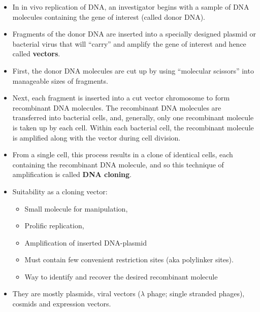 \documentclass[11pt,dvipsnames,ignorenonframetext,aspectratio=169]{beamer}
\providecommand{\tightlist}{%
  \setlength{\itemsep}{0pt}\setlength{\parskip}{0pt}}
\begin{document}
\begin{frame}{}
\protect\hypertarget{section-21}{}

\begin{itemize}
\tightlist
\item
  In in vivo replication of DNA, an investigator begins with a sample of
  DNA molecules containing the gene of interest (called donor DNA).
\item
  Fragments of the donor DNA are inserted into a specially designed
  plasmid or bacterial virus that will ``carry'' and amplify the gene of
  interest and hence called \textbf{vectors}.
\item
  First, the donor DNA molecules are cut up by using ``molecular
  scissors'' into manageable sizes of fragments.
\item
  Next, each fragment is inserted into a cut vector chromosome to form
  recombinant DNA molecules. The recombinant DNA molecules are
  transferred into bacterial cells, and, generally, only one recombinant
  molecule is taken up by each cell. Within each bacterial cell, the
  recombinant molecule is amplified along with the vector during cell
  division.
\item
  From a single cell, this process results in a clone of identical
  cells, each containing the recombinant DNA molecule, and so this
  technique of amplification is called \textbf{DNA cloning}.
\end{itemize}

\end{frame}

\begin{frame}{}
\protect\hypertarget{section-22}{}

\begin{itemize}
\tightlist
\item
  Suitability as a cloning vector:

  \begin{itemize}
  \tightlist
  \item
    Small molecule for manipulation,
  \item
    Prolific replication,
  \item
    Amplification of inserted DNA-plasmid
  \item
    Must contain few convenient restriction sites (aka polylinker
    sites).
  \item
    Way to identify and recover the desired recombinant molecule
  \end{itemize}
\item
  They are mostly plasmids, viral vectors (\(\lambda\) phage; single
  stranded phages), cosmids and expression vectors.
\end{itemize}

\end{frame}
\end{document}
